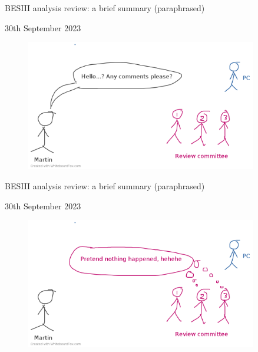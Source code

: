 \documentclass{beamer}
\begin{document}
\begin{frame}{BESIII analysis review: a brief summary (paraphrased)}
  \begin{center}
    {\large 30th September 2023}
  \end{center}
  \begin{figure}
    \includegraphics[width=0.9\textwidth,trim={0 0 0 0.5cm},clip=true]{Plots/BESIII_review_process_5.png}
  \end{figure}
\end{frame}

\begin{frame}{BESIII analysis review: a brief summary (paraphrased)}
  \begin{center}
    {\large 30th September 2023}
  \end{center}
  \begin{figure}
    \includegraphics[width=0.9\textwidth,trim={0 0 0 0.5cm},clip=true]{Plots/BESIII_review_process_6.png}
  \end{figure}
\end{frame}
\end{document}

